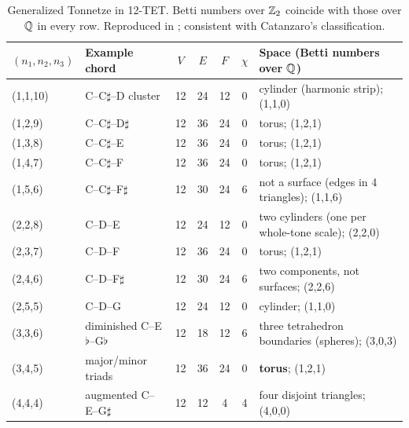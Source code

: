\begin{table}[t]\centering\small
\begin{tabular}{@{}llccccl@{}}\toprule
$(n_1,n_2,n_3)$ & Example chord & $V$ & $E$ & $F$ & $\chi$ & Space (Betti numbers over $\mathbb{Q}$)\\\midrule
(1,1,10) & C--C$\sharp$--D cluster & 12 & 24 & 12 & 0 & cylinder (harmonic strip); (1,1,0)\\
(1,2,9)  & C--C$\sharp$--D$\sharp$ & 12 & 36 & 24 & 0 & torus; (1,2,1)\\
(1,3,8)  & C--C$\sharp$--E & 12 & 36 & 24 & 0 & torus; (1,2,1)\\
(1,4,7)  & C--C$\sharp$--F & 12 & 36 & 24 & 0 & torus; (1,2,1)\\
(1,5,6)  & C--C$\sharp$--F$\sharp$ & 12 & 30 & 24 & 6 & not a surface (edges in 4 triangles); (1,1,6)\\
(2,2,8)  & C--D--E & 12 & 24 & 12 & 0 & two cylinders (one per whole-tone scale); (2,2,0)\\
(2,3,7)  & C--D--F & 12 & 36 & 24 & 0 & torus; (1,2,1)\\
(2,4,6)  & C--D--F$\sharp$ & 12 & 30 & 24 & 6 & two components, not surfaces; (2,2,6)\\
(2,5,5)  & C--D--G & 12 & 24 & 12 & 0 & cylinder; (1,1,0)\\
(3,3,6)  & diminished C--E$\flat$--G$\flat$ & 12 & 18 & 12 & 6 & three tetrahedron boundaries (spheres); (3,0,3)\\
(3,4,5)  & major/minor triads & 12 & 36 & 24 & 0 & \textbf{torus}; (1,2,1)\\
(4,4,4)  & augmented C--E--G$\sharp$ & 12 & 12 & 4 & 4 & four disjoint triangles; (4,0,0)\\\bottomrule
\end{tabular}
\caption{Generalized Tonnetze in 12-TET. Betti numbers over $\mathbb{Z}_2$ coincide with those over $\mathbb{Q}$ in every row.
Reproduced in ; consistent with Catanzaro's classification.}
\label{tab:gentonnetz}
\end{table}

